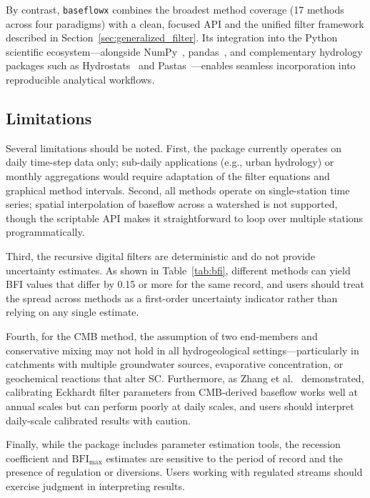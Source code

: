 \documentclass[hydrology,article,submit,pdftex,moreauthors]{Definitions/mdpi}
\begin{document}
By contrast, \texttt{baseflowx} combines the broadest method coverage (17 methods across four paradigms) with a clean, focused API and the unified filter framework described in Section~\ref{sec:generalized_filter}. Its integration into the Python scientific ecosystem---alongside NumPy~\cite{Harris2020}, pandas~\cite{McKinney2010}, and complementary hydrology packages such as Hydrostats~\cite{Roberts2018} and Pastas~\cite{Collenteur2019}---enables seamless incorporation into reproducible analytical workflows.

\subsection{Limitations}
\label{sec:limitations}

Several limitations should be noted. First, the package currently operates on daily time-step data only; sub-daily applications (e.g., urban hydrology) or monthly aggregations would require adaptation of the filter equations and graphical method intervals. Second, all methods operate on single-station time series; spatial interpolation of baseflow across a watershed is not supported, though the scriptable API makes it straightforward to loop over multiple stations programmatically.

Third, the recursive digital filters are deterministic and do not provide uncertainty estimates. As shown in Table~\ref{tab:bfi}, different methods can yield BFI values that differ by 0.15 or more for the same record, and users should treat the spread across methods as a first-order uncertainty indicator rather than relying on any single estimate.

Fourth, for the CMB method, the assumption of two end-members and conservative mixing may not hold in all hydrogeological settings---particularly in catchments with multiple groundwater sources, evaporative concentration, or geochemical reactions that alter SC. Furthermore, as Zhang et al.~\cite{Zhang2021} demonstrated, calibrating Eckhardt filter parameters from CMB-derived baseflow works well at annual scales but can perform poorly at daily scales, and users should interpret daily-scale calibrated results with caution.

Finally, while the package includes parameter estimation tools, the recession coefficient and $\mathrm{BFI_{max}}$ estimates are sensitive to the period of record and the presence of regulation or diversions. Users working with regulated streams should exercise judgment in interpreting results.
\end{document}
